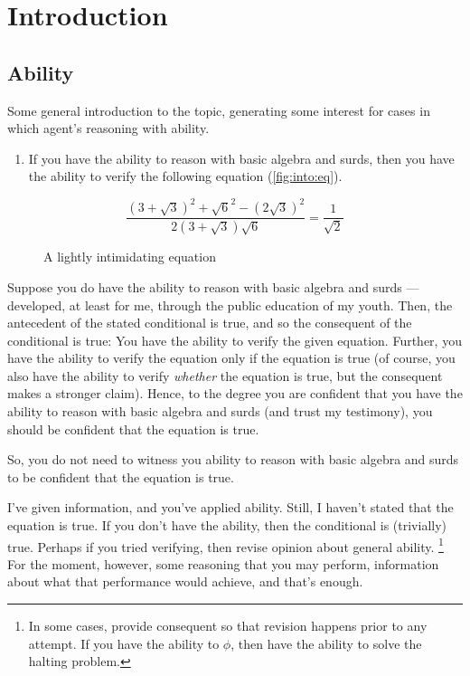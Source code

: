 
\chapter{Introduction}
\label{cha:introduction}

\section{Ability}
\label{sec:ability-broad-intro}

\begin{note}
  \color{red}
  Some general introduction to the topic, generating some interest for cases in which agent's reasoning with ability.
\end{note}

\begin{note}
  \begin{enumerate}
  \item If you have the ability to reason with basic algebra and surds, then you have the ability to verify the following equation (\autoref{fig:into:eq}).
  \end{enumerate}

  \begin{figure}[H]
    \[\frac{(3 + \sqrt{3})^{2} + \sqrt{6}^{2} - (2\sqrt{3})^{2}}{2(3 + \sqrt{3})\sqrt{6}} = \frac{1}{\sqrt{2}}\]
    \caption{A lightly intimidating equation}
    \label{fig:into:eq}
  \end{figure}

  Suppose you do have the ability to reason with basic algebra and surds --- developed, at least for me, through the public education of my youth.
  Then, the antecedent of the stated conditional is true, and so the consequent of the conditional is true:
  You have the ability to verify the given equation.
  Further, you have the ability to verify the equation only if the equation is true (of course, you also have the ability to verify \emph{whether} the equation is true, but the consequent makes a stronger claim).
  Hence, to the degree you are confident that you have the ability to reason with basic algebra and surds (and trust my testimony), you should be confident that the equation is true.

  So, you do not need to witness you ability to reason with basic algebra and surds to be confident that the equation is true.

  I've given information, and you've applied ability.
  Still, I haven't stated that the equation is true.
  If you don't have the ability, then the conditional is (trivially) true.
  Perhaps if you tried verifying, then revise opinion about general ability.\nolinebreak
  \footnote{
    In some cases, provide consequent so that revision happens prior to any attempt.
    If you have the ability to \(\phi\), then have the ability to solve the halting problem.
  }
  For the moment, however, some reasoning that you may perform, information about what that performance would achieve, and that's enough.
\end{note}

